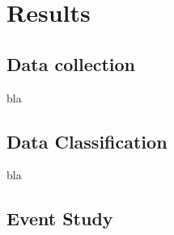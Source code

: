 \chapter{Results}
\label{chap:result}

\section{Data collection}
bla

\section{Data Classification}
bla

\section{Event Study}